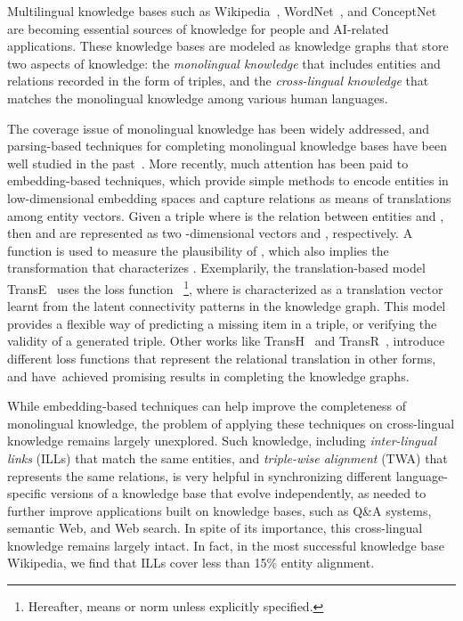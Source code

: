 \documentclass{article}
\def\st#1{~}
\begin{document}
Multilingual knowledge bases such as Wikipedia~\cite{url:wiki}, WordNet~\cite{bond2013linking}, and ConceptNet~\cite{speer2013conceptnet} are becoming essential sources of knowledge for people and AI-related applications.
These knowledge bases are modeled as knowledge graphs that store two aspects of knowledge: the {\em monolingual knowledge} that includes entities and relations recorded in the form of triples, and the {\em cross-lingual knowledge} that matches the monolingual knowledge among various human languages. \par



The coverage issue of monolingual knowledge has been widely addressed, and parsing-based techniques for completing monolingual knowledge bases have been well studied in the past~\cite{culotta2004dependency,guodong2005exploring,sun2011semi}. More recently, much attention has been paid to embedding-based techniques, which provide simple methods to encode entities in low-dimensional embedding spaces and capture relations as means of translations among entity vectors.
Given a triple  where  is the relation between entities  and , then  and  are represented as two -dimensional vectors  and , respectively. A function  is used to measure the plausibility of , which also implies the transformation  that characterizes .
Exemplarily, the translation-based model TransE~\cite{bordes2013translating} uses the loss function ~\footnote{Hereafter,  means  or  norm unless explicitly specified.}, where  is characterized as a translation vector learnt from the latent connectivity patterns in the knowledge graph. This model provides a flexible way of predicting
a missing item in a triple, or verifying the validity of a generated triple. Other works like TransH~\cite{wang2014knowledge} and TransR~\cite{lin2015learning}, introduce different loss functions that represent the relational translation in other forms, and have\st{ already }achieved promising results in completing the knowledge graphs. \par 

While embedding-based techniques can help improve the completeness of
monolingual knowledge, the problem of applying these techniques on cross-lingual knowledge remains largely unexplored.
Such knowledge, including {\em inter-lingual links} (ILLs) that match the same entities, and {\em triple-wise alignment} (TWA) that represents the same relations, is
very helpful in synchronizing different language-specific \mbox{versions} of a knowledge base that evolve independently, as needed to further improve applications built on knowledge bases, such as Q\&A systems, semantic Web, and Web search.
In spite of its importance, this cross-lingual knowledge \mbox{remains} largely intact.
In fact, in the most successful knowledge base Wikipedia, we find that ILLs cover less than 15\% entity alignment.\par
\end{document}
